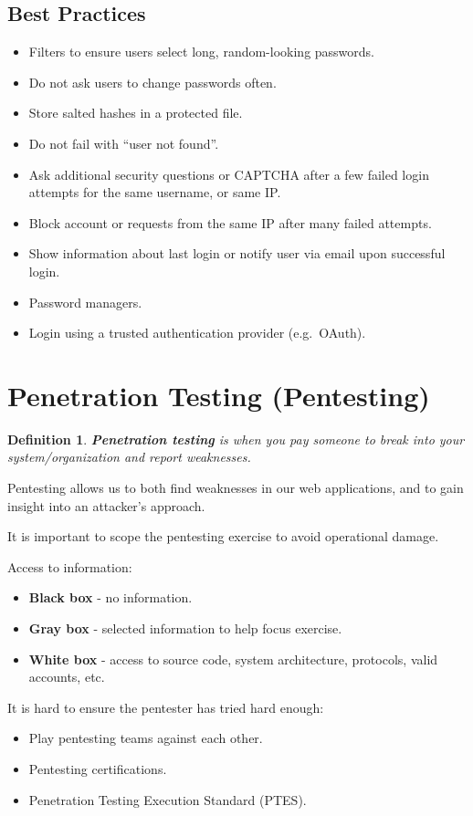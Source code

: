 \documentclass[11pt]{article}
\newtheorem{defn}{Definition}
\begin{document}
\subsection{Best Practices}
\begin{itemize}
  \item Filters to ensure users select long, random-looking passwords.
  \item Do not ask users to change passwords often.
  \item Store salted hashes in a protected file.
  \item Do not fail with ``user not found''.
  \item Ask additional security questions or CAPTCHA after a few failed login attempts for the same username, or same IP.
  \item Block account or requests from the same IP after many failed attempts.
  \item Show information about last login or notify user via email upon successful login.
  \item Password managers.
  \item Login using a trusted authentication provider (e.g.\ OAuth).
\end{itemize}

\section{Penetration Testing (Pentesting)}
\begin{defn}
  \textbf{Penetration testing} is when you pay someone to break into your system/organization and report weaknesses.
\end{defn}
Pentesting allows us to both find weaknesses in our web applications, and to gain insight into an attacker's approach.

It is important to scope the pentesting exercise to avoid operational damage.

Access to information:
\begin{itemize}
  \item \textbf{Black box} - no information.
  \item \textbf{Gray box} - selected information to help focus exercise.
  \item \textbf{White box} - access to source code, system architecture, protocols, valid accounts, etc.
\end{itemize}

It is hard to ensure the pentester has tried hard enough:
\begin{itemize}
  \item Play pentesting teams against each other.
  \item Pentesting certifications.
  \item Penetration Testing Execution Standard (PTES).
\end{itemize}
\end{document}
